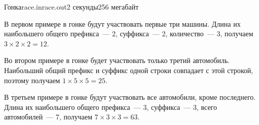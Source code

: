 \begin{problem}{Гонка}{race.in}{race.out}{2 секунды}{256 мегабайт}
\Example
\begin{example}%
%
%
%
\end{example}

\Note
В первом примере в гонке будут участвовать первые три машины. Длина их наибольшего общего префикса~--- 2, суффикса~--- 2, количество~--- 3, получаем $3 \times 2 \times 2 = 12$.

Во втором примере в гонке будет участвовать только третий автомобиль. Наибольший общий префикс и суффикс одной строки совпадает с этой строкой, поэтому получаем $1\times 5 \times 5 = 25$.

В третьем примере в гонке будут участвовать все автомобили, кроме последнего. Длина их наибольшего общего префикса~--- 3, суффикса~--- 3, всего автомобилей~--- 7, получаем $7 \times 3 \times 3 = 63$.
\end{problem}